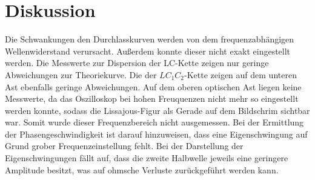 \section{Diskussion}
\label{sec:Diskussion}
Die Schwankungen den Durchlasskurven werden von dem frequenzabhängigen Wellenwiderstand verursacht. Außerdem konnte dieser nicht exakt eingestellt werden. Die Messwerte zur Dispersion der LC-Kette zeigen nur geringe Abweichungen zur Theoriekurve. Die der $LC_{1}C_{2}$-Kette zeigen auf dem unteren Ast ebenfalls geringe Abweichungen. Auf dem oberen optischen Ast liegen keine Messwerte, da das Oszilloskop bei hohen Freuquenzen nicht mehr so eingestellt werden konnte, sodass die Lissajous-Figur als Gerade auf dem Bildschrim sichtbar war. Somit wurde dieser Frequenzbereich nicht ausgemessen. Bei der Ermittlung der Phasengeschwindigkeit ist darauf hinzuweisen, dass eine Eigenschwingung auf Grund grober Frequenzeinstellung fehlt.
Bei der Darstellung der Eigenschwingungen fällt auf, dass die zweite Halbwelle jeweils eine geringere Amplitude besitzt, was auf ohmsche Verluste zurückgeführt werden kann.
